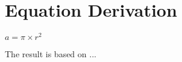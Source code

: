 %

\chapter{Equation Derivation}


$a = \pi \times r^2$

The result is based on \cite{lyle88}...

\chapterend


